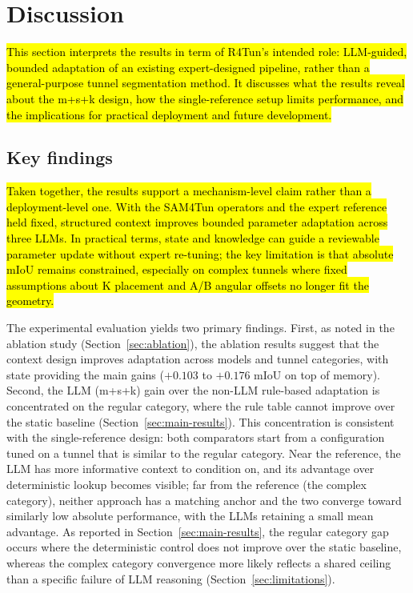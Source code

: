 \documentclass[a4paper,fleqn]{cas-dc}
\begin{document}
{\section{Discussion}\label{sec:discussion}

\hl{This section interprets the results in term of R4Tun's intended role: LLM-guided, bounded adaptation of an existing expert-designed pipeline, rather than a general-purpose tunnel segmentation method. It discusses what the results reveal about the m+s+k design, how the single-reference setup limits performance, and the implications for practical deployment and future development.}

\subsection{Key findings}

\hl{Taken together, the results support a mechanism-level claim rather than a deployment-level one. With the SAM4Tun operators and the expert reference held fixed, structured context improves bounded parameter adaptation across three LLMs. In practical terms, state and knowledge can guide a reviewable parameter update without expert re-tuning; the key limitation is that absolute mIoU remains constrained, especially on complex tunnels where fixed assumptions about K placement and A/B angular offsets no longer fit the geometry.}

The experimental evaluation yields two primary findings. First, as noted in the ablation study (Section~\ref{sec:ablation}), the ablation results suggest that the context design improves adaptation across models and tunnel categories, with state providing the main gains ($+0.103$ to $+0.176$ mIoU on top of memory). Second, the LLM (m+s+k) gain over the non-LLM rule-based adaptation is concentrated on the regular category, where the rule table cannot improve over the static baseline (Section~\ref{sec:main-results}). This concentration is consistent with the single-reference design: both comparators start from a configuration tuned on a tunnel that is similar to the regular category. Near the reference, the LLM has more informative context to condition on, and its advantage over deterministic lookup becomes visible; far from the reference (the complex category), neither approach has a matching anchor and the two converge toward similarly low absolute performance, with the LLMs retaining a small mean advantage. As reported in Section~\ref{sec:main-results}, the regular category gap occurs where the deterministic control does not improve over the static baseline, whereas the complex category convergence more likely reflects a shared ceiling than a specific failure of LLM reasoning (Section~\ref{sec:limitations}).


}
\end{document}
